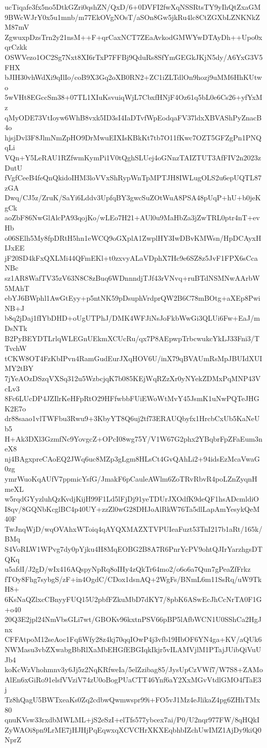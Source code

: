 ucTiqafe3fx5no5DtkGZri0qshZN/QxD/6+0DVFI2fwXqNSSRtsTY9yIhQtZxaGM
9BWcWJrY0x5u1mnb/m77EkOVgNOsT/aSOn8Gw5jkRu4lc8CtZGXbLZNKNkZM87mV
ZgwuxpDzsTrn2y21nsM++F+qrCaxNCT7ZEaAvkodGMWYwDTAyDh++Upo0xqrCzkk
OSWVezo1OC2Sg7Nxt8XI6rTxP7FFBj9QduRs8SfYmGEGkJKjN5dy/A6YxG3V5FHX
bJIH30vhWdXi9qIlIo/coB9X3Gq2oXB0RN2+ZC1iZLTdlOn9hozj9uMM6HhKUtwo
5wVHt8EGccSm38+07TL1XIuKsvuiqWjL7CbxfHNjF4Oz61q5bL0e6Cs26+yfYxMz
qMyODE73VtIoyw6WhB8vxk5ID3sI4IaDTvfWpEodqaFV37ldxXBVAShPyZnacB4o
hjsjDvl3F8JlmNmZpHO9DrMwuEIXIsKBkKt7tb7O11fKwc7OZT5GFZgPn1PNQqLi
VQn+Y5LeRAU1RZfwmKymPi1V0tQghSLUej4oGNnzTAIZTUT3AfFIV2n2023zDutU
fVgfCeeB4feQnQkidoIHM3loVVxShRypWnTpMPTJH8IWLugOLS2u6epUQTL87zGA
Dwq/CJ5z/ZruK/SaYi6Lddv3UpfqBY3gwcSuZOtWuA8PSA48pUqP+hU+b0jeKgCk
aoZbF86NwGlAlcPA93qojKo/wLEo7H21+AUl0u9MaHbZa3jZwTRL0ptr4nT+evHb
o06SElh5My8fpDRtH5hn1eWCQ9oGXplA1ZwplHY3IwDBvKMWsn/HpDCAyxHIJxEE
jF20SD4kFxQXLMi44QFmEKl+t0zxvyALaVDphX7Hc9e6SZ8z5JvF1FPX6sCcaNBc
sz1AR8WafTV35zV63N8C8zBuq6WDnnndjTJf43rVNvq+ruBTdNSMNwAArbW5MAhT
ebYJ6BWphl1AwGtEyy+p5ntNK59pDsuphVrdprQW2B6C78mBOtg+aXEp8PwiNB+J
b8q2jDaj1fIYbDHD+oUgUTPhJ/DMK4WFJiNsJoFkbWwGi3QLUi6Fw+EaJ/mDsNTk
B2PyBEYDTLrlqWLEGnUEkmXCUcRu/qx7P8AEpwpTrbcwukcYkLJ33Fni3/TTvchW
tCKW8OT4FzKbIPvn4RamGudEurJXqHOV6U/inX79qBVAUmRsMpJBUIdXUIMY2tBY
7jYeAOzDSzqVXSq312u5WzbcjqK7b085KEjWqRZzXr0yNYekZDMxPqMNP43VcLv3
8Fc6LUcDP4JZIlrKeHFpRtO29HFfwbbFUiEWoWtMvY45JsmK1uNwPQTeJHGK2E7o
dr88saao1vlTWFbu3Rwu9+3KbyYT8Q6uj2tf73ERAUQbyfx1HrcbCxUb5KaNeUb5
H+Ak3DXl3GzmfNc9YovgcZ+OPcI08wg75Y/V1W67G2phx2YBqbrFpZFaEum3neX8
nj4BAgxpreCAoEQ2JWq6uc8MZp3gLgm8HLsCt4GvQAhLi2+94idsEzMcaVwaG0zg
ymrWuoKqAUfV7ppmicYsfG/JmakF6pCauleAWlm6ZoTRvRbvR4poLZnZyqnHmeXL
w5rqdGYyzluhQzKvdjKijH99F1Ld5lFjDj91yeTDUrJXOdfK9deQF1hsADcmldiO
I8qv/8GQNbKcglBC4p40UY+zzZl0wG28DHJoAlRkW76Ta5dlLapAmYesykQeM40F
TwJnqWjD/wqOVAhxWToiq4qAYQXMAZXTVPUIeaFuzt53TnI217b1aRt/165k/BMq
S4VoRLW1WPvg7dy0pYjku4H8MqEOBG2B8A7R6PnrYcPV9ohtQJIrYarzhgsDTQKq
u5afdI/J2gD/wIx416AQspyNpRq8oIHy4zQkTr64mo2/o6o6a7Qun7gPeaZfFrkz
fTOy8Fhg7sybgS/zF+in4OgdC/CDox1dsnAQ+2WgFs/BNmL6m11SsRq/uW9TkH8+
6KsNaQZlxcCBnyyFUQ15U2pbfFZkuMbD7dKY7/8pbK6ASwEcJhCcNrTA0F1G+o40
20Q3E2jpl24NmVbsGLi7wt/GBOKv96kxtnPSV66pBP5lAfbWCN1U0SShCa2HgJnx
CFFAtpoM12seAoc1FqfiWfy28z4kj70qqIOwP4j3vfb19HbOF6YN4ga+KV/aQUk6
NWMasu3vbZXwabgBbRlXaMbEHGfEBGIqkIkjr5vILAMVjlM1PTajJUibQiVuUJb4
koKcWzVhohmnv3y6Jj5z2NqKRfweIa/5elZzibag85/JysUpCzVWf7/W7S8+ZAMo
AlEn6xGiRo91elsfVVziV74zU0oBogPUaCTT46Ynf6aY2XxMGvVtdlGMO4fTaE3j
Tz8hQagU5BWTxeaKs0Zq2cdbwQwmwspr99i+FO5vJ1Mz4eJlikaZ4pg6ZHhTMx80
qnuKVsw33rxdbMWLML+jS2eSzI+elTfs577ybcex7ai/P0/U2nqr977FW/8qHQkI
ZyWAOi8pn9LrME7jHJHjPqEqwxqXCVCHrXKXEqbhbIZchUwIMZ1AjDy9kiQ0NprZ
